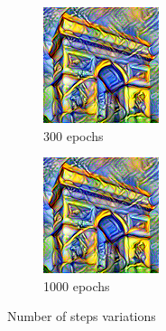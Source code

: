 \documentclass[twocolumn,superscriptaddress,aps, floatfix]{revtex4-1}
\begin{document}
    \begin{figure}[ht]
        \centering
        \begin{subfigure}[b]{0.22\textwidth}
            \centering
            \includegraphics[width=\textwidth]{resources/png/steps/sun-trees-paris-300.png}
            \caption{300 epochs}
        \end{subfigure}
        \hfill
        \begin{subfigure}[b]{0.22\textwidth}
            \centering
            \includegraphics[width=\textwidth]{resources/png/steps/sun-trees-paris-1000.png}
            \caption{1000 epochs}
        \end{subfigure}
        \caption{Number of steps variations}
        \label{fig:number.steps.variations}
    \end{figure}
    
\end{document}
